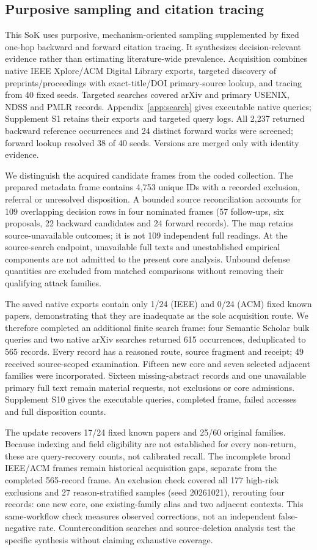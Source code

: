 \subsection{Purposive sampling and citation tracing}
This SoK uses purposive, mechanism-oriented sampling supplemented by fixed one-hop backward and forward citation tracing. It synthesizes decision-relevant evidence rather than estimating literature-wide prevalence. Acquisition combines native IEEE Xplore/ACM Digital Library exports, targeted discovery of preprints/proceedings with exact-title/DOI primary-source lookup, and tracing from 40 fixed seeds. Targeted searches covered arXiv and primary USENIX, NDSS and PMLR records. Appendix~\ref{app:search} gives executable native queries; Supplement S1 retains their exports and targeted query logs. All 2,237 returned backward reference occurrences and 24 distinct forward works were screened; forward lookup resolved 38 of 40 seeds. Versions are merged only with identity evidence.

We distinguish the acquired candidate frames from the coded collection. The prepared metadata frame contains 4,753 unique IDs with a recorded exclusion, referral or unresolved disposition. A bounded source reconciliation accounts for 109 overlapping decision rows in four nominated frames (57 follow-ups, six proposals, 22 backward candidates and 24 forward records). The map retains source-unavailable outcomes; it is not 109 independent full readings. At the source-search endpoint, unavailable full texts and unestablished empirical components are not admitted to the present core analysis. Unbound defense quantities are excluded from matched comparisons without removing their qualifying attack families.

The saved native exports contain only 1/24 (IEEE) and 0/24 (ACM) fixed known papers, demonstrating that they are inadequate as the sole acquisition route. We therefore completed an additional finite search frame: four Semantic Scholar bulk queries and two native arXiv searches returned 615 occurrences, deduplicated to 565 records. Every record has a reasoned route, source fragment and receipt; 49 received source-scoped examination. Fifteen new core and seven selected adjacent families were incorporated. Sixteen missing-abstract records and one unavailable primary full text remain material requests, not exclusions or core admissions. Supplement S10 gives the executable queries, completed frame, failed accesses and full disposition counts.

The update recovers 17/24 fixed known papers and 25/60 original families. Because indexing and field eligibility are not established for every non-return, these are query-recovery counts, not calibrated recall. The incomplete broad IEEE/ACM frames remain historical acquisition gaps, separate from the completed 565-record frame. An exclusion check covered all 177 high-risk exclusions and 27 reason-stratified samples (seed 20261021), rerouting four records: one new core, one existing-family alias and two adjacent contexts. This same-workflow check measures observed corrections, not an independent false-negative rate. Countercondition searches and source-deletion analysis test the specific synthesis without claiming exhaustive coverage.

